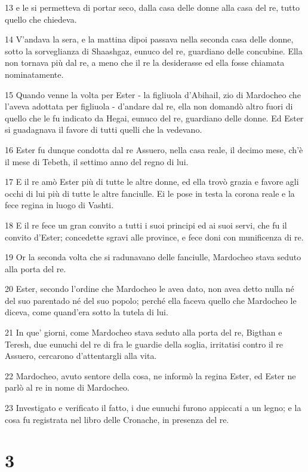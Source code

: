 \par 13 e le si permetteva di portar seco, dalla casa delle donne alla casa del re, tutto quello che chiedeva.
\par 14 V'andava la sera, e la mattina dipoi passava nella seconda casa delle donne, sotto la sorveglianza di Shaashgaz, eunuco del re, guardiano delle concubine. Ella non tornava più dal re, a meno che il re la desiderasse ed ella fosse chiamata nominatamente.
\par 15 Quando venne la volta per Ester - la figliuola d'Abihail, zio di Mardocheo che l'aveva adottata per figliuola - d'andare dal re, ella non domandò altro fuori di quello che le fu indicato da Hegai, eunuco del re, guardiano delle donne. Ed Ester si guadagnava il favore di tutti quelli che la vedevano.
\par 16 Ester fu dunque condotta dal re Assuero, nella casa reale, il decimo mese, ch'è il mese di Tebeth, il settimo anno del regno di lui.
\par 17 E il re amò Ester più di tutte le altre donne, ed ella trovò grazia e favore agli occhi di lui più di tutte le altre fanciulle. Ei le pose in testa la corona reale e la fece regina in luogo di Vashti.
\par 18 E il re fece un gran convito a tutti i suoi principi ed ai suoi servi, che fu il convito d'Ester; concedette sgravi alle province, e fece doni con munificenza di re.
\par 19 Or la seconda volta che si radunavano delle fanciulle, Mardocheo stava seduto alla porta del re.
\par 20 Ester, secondo l'ordine che Mardocheo le avea dato, non avea detto nulla né del suo parentado né del suo popolo; perché ella faceva quello che Mardocheo le diceva, come quand'era sotto la tutela di lui.
\par 21 In que' giorni, come Mardocheo stava seduto alla porta del re, Bigthan e Teresh, due eunuchi del re di fra le guardie della soglia, irritatisi contro il re Assuero, cercarono d'attentargli alla vita.
\par 22 Mardocheo, avuto sentore della cosa, ne informò la regina Ester, ed Ester ne parlò al re in nome di Mardocheo.
\par 23 Investigato e verificato il fatto, i due eunuchi furono appiccati a un legno; e la cosa fu registrata nel libro delle Cronache, in presenza del re.

\chapter{3}

